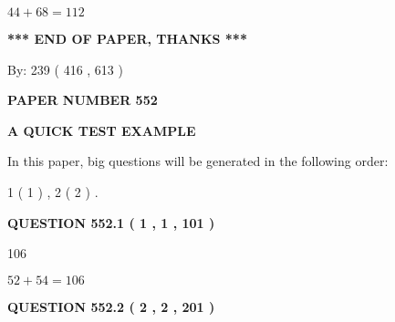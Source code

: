 \documentclass[12pt]{article}
\begin{document}
$ %
44 +  %
68=   %
112$
 
 
   
   
 \vspace{0.2in}
 
   
   
   
   
\vspace{1.0in} 
{\textbf{\large{ *** END OF PAPER, THANKS *** }}} 
   
   
\hspace{1.0in} By: 
 239 ( 416 ,  613 )
   
   
   
   
\newpage 
\setcounter{page}{ 
   552001 } 
   
   
   
   
 {\textbf{ \Large{ PAPER NUMBER  552  }}}
   
   
\vspace{0.2in}
   
   
   
   
   
   
 \vspace{0.2in}
{\LARGE {\textbf{ A QUICK TEST EXAMPLE}}}
   
   
   
\vspace{0.2in}
   
In this paper, big questions will be generated in the following order: 
   
   
   1 ( 1 )
 ,
   2 ( 2 )
 .
  
\vspace{0.2in}
  
{\textbf{\Large{QUESTION
552.1 
 ( 1 , 1 , 101 )
}}}
  
  
 
 
\noindent{}

106
 
 
 
 
\noindent{}

$ %
52 +  %
54=   %
106$
 
 
  
\vspace{0.2in}
  
{\textbf{\Large{QUESTION
552.2 
 ( 2 , 2 , 201 )
}}}
  
\end{document}
